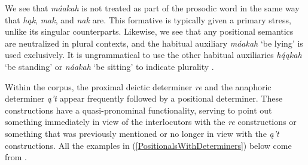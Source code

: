We see that \textit{máakah} is not treated as part of the prosodic word in the same way that \textit{hąk}, \textit{mak}, and \textit{nak} are. This formative is typically given a primary stress, unlike its singular counterparts. Likewise, we see that any positional semantics are neutralized in plural contexts, and the habitual auxiliary \textit{máakah} `be lying' is used exclusively. It is ungrammatical to use the other habitual auxiliaries \textit{hą́ąkah} `be standing' or \textit{náakah} `be sitting' to indicate plurality \citep{trechter2013}.

Within the corpus, the proximal deictic determiner \textit{re} and the anaphoric determiner \textit{ą't} appear frequently followed by a positional determiner. These constructions have a quasi-pronominal functionality, serving to point out something immediately in view of the interlocutors with the \textit{re} constructions or something that was previously mentioned or no longer in view with the \textit{ą't} constructions. All the examples in (\ref{PositionalsWithDeterminers}) below come from \citet[28]{kennard1936}.

